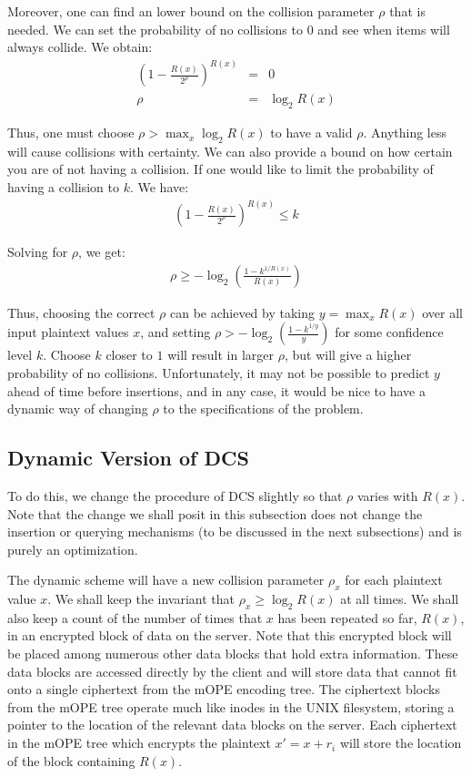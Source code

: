 \documentclass[12pt]{article}
\begin{document}
Moreover, one can find an lower bound on the collision parameter $\rho$ that is needed. We can set the probability of no collisions to 0 and see when items will always collide. We obtain:
\begin{eqnarray}
  \left(1 - \frac{R(x)}{2^{\rho}} \right)^{R(x)} &=& 0 \\
                                            \rho &=& \log_2 R(x)
\end{eqnarray}

Thus, one must choose $\rho > \max_x \log_2 R(x)$ to have a valid $\rho$. Anything less will cause collisions with certainty. We can also provide a bound on how certain you are of not having a collision. If one would like to limit the probability of having a collision to $k$. We have:
\begin{eqnarray}
  \left(1 - \frac{R(x)}{2^{\rho}} \right)^{R(x)} \leq k
\end{eqnarray}

Solving for $\rho$, we get:
\begin{eqnarray}
   \rho \geq - \log_2 \left( \frac{1 - k^{1/R(x)}}{R(x)} \right)
\end{eqnarray}

Thus, choosing the correct $\rho$ can be achieved by taking $y = \max_x R(x)$ over all input plaintext values $x$, and setting $\rho > - \log_2 \left( \frac{1 - k^{1/y}}{y} \right)$ for some confidence level $k$. Choose $k$ closer to $1$ will result in larger $\rho$, but will give a higher probability of no collisions. Unfortunately, it may not be possible to predict $y$ ahead of time before insertions, and in any case, it would be nice to have a dynamic way of changing $\rho$ to the specifications of the problem.

\subsection{Dynamic Version of DCS}

To do this, we change the procedure of DCS slightly so that $\rho$ varies with $R(x)$. Note that the change we shall posit in this subsection does not change the insertion or querying mechanisms (to be discussed in the next subsections) and is purely an optimization.

The dynamic scheme will have a new collision parameter $\rho_x$ for each plaintext value $x$. We shall keep the invariant that $\rho_x \geq \log_2 R(x)$ at all times. We shall also keep a count of the number of times that $x$ has been repeated so far, $R(x)$, in an encrypted block of data on the server. Note that this encrypted block will be placed among numerous other data blocks that hold extra information. These data blocks are accessed directly by the client and will store data that cannot fit onto a single ciphertext from the mOPE encoding tree. The ciphertext blocks from the mOPE tree operate much like inodes in the UNIX filesystem, storing a pointer to the location of the relevant data blocks on the server. Each ciphertext in the mOPE tree which encrypts the plaintext $x' = x + r_i$ will store the location of the block containing $R(x)$.
\end{document}
